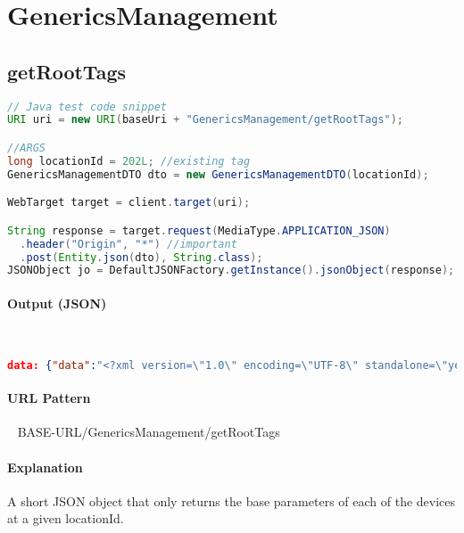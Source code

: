 \documentclass[
10pt, %
letterpaper, %
oneside, %
headinclude,footinclude, %
BCOR5mm, %
]{scrartcl}
\begin{document}

\section{GenericsManagement}


\subsection{\textbf{getRootTags}}

\begin{lstlisting}[language=Java]
// Java test code snippet
URI uri = new URI(baseUri + "GenericsManagement/getRootTags");

//ARGS
long locationId = 202L; //existing tag
GenericsManagementDTO dto = new GenericsManagementDTO(locationId);

WebTarget target = client.target(uri);

String response = target.request(MediaType.APPLICATION_JSON)
  .header("Origin", "*") //important
  .post(Entity.json(dto), String.class);
JSONObject jo = DefaultJSONFactory.getInstance().jsonObject(response);
\end{lstlisting}

\paragraph{Output (JSON)} ~
\begin{lstlisting}[language=json]
data: {"data":"<?xml version=\"1.0\" encoding=\"UTF-8\" standalone=\"yes\"?><deviceTag id=\"1380746460877\" name=\"device_tags\" locationId=\"202\"><deviceTag id=\"1380746460880\" name=\"Electrical\" locationId=\"202\"/><deviceTag id=\"1380746461403\" name=\"End Use\" locationId=\"202\"/><deviceTag id=\"1380746461481\" name=\"Location\" locationId=\"202\"/><\/deviceTag>"}
\end{lstlisting}

\paragraph{URL Pattern} 
~\newline
BASE-URL/GenericsManagement/getRootTags

\paragraph{Explanation} A short JSON object that only returns the base parameters of each of the devices at a given locationId.
\end{document}
